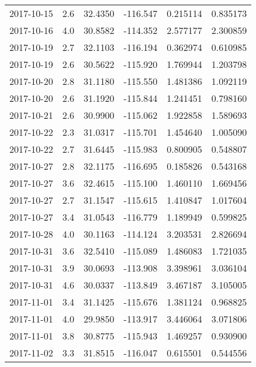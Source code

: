 \begin{tabular}{lrrrrr}
2017-10-15 &       2.6 &  32.4350 &  -116.547 &         0.215114 &         0.835173 \\
2017-10-16 &       4.0 &  30.8582 &  -114.352 &         2.577177 &         2.300859 \\
2017-10-19 &       2.7 &  32.1103 &  -116.194 &         0.362974 &         0.610985 \\
2017-10-19 &       2.6 &  30.5622 &  -115.920 &         1.769944 &         1.203798 \\
2017-10-20 &       2.8 &  31.1180 &  -115.550 &         1.481386 &         1.092119 \\
2017-10-20 &       2.6 &  31.1920 &  -115.844 &         1.241451 &         0.798160 \\
2017-10-21 &       2.6 &  30.9900 &  -115.062 &         1.922858 &         1.589693 \\
2017-10-22 &       2.3 &  31.0317 &  -115.701 &         1.454640 &         1.005090 \\
2017-10-22 &       2.7 &  31.6445 &  -115.983 &         0.800905 &         0.548807 \\
2017-10-27 &       2.8 &  32.1175 &  -116.695 &         0.185826 &         0.543168 \\
2017-10-27 &       3.6 &  32.4615 &  -115.100 &         1.460110 &         1.669456 \\
2017-10-27 &       2.7 &  31.1547 &  -115.615 &         1.410847 &         1.017604 \\
2017-10-27 &       3.4 &  31.0543 &  -116.779 &         1.189949 &         0.599825 \\
2017-10-28 &       4.0 &  30.1163 &  -114.124 &         3.203531 &         2.826694 \\
2017-10-31 &       3.6 &  32.5410 &  -115.089 &         1.486083 &         1.721035 \\
2017-10-31 &       3.9 &  30.0693 &  -113.908 &         3.398961 &         3.036104 \\
2017-10-31 &       4.6 &  30.0337 &  -113.849 &         3.467187 &         3.105005 \\
2017-11-01 &       3.4 &  31.1425 &  -115.676 &         1.381124 &         0.968825 \\
2017-11-01 &       4.0 &  29.9850 &  -113.917 &         3.446064 &         3.071806 \\
2017-11-01 &       3.8 &  30.8775 &  -115.943 &         1.469257 &         0.930900 \\
2017-11-02 &       3.3 &  31.8515 &  -116.047 &         0.615501 &         0.544556 \\

\end{tabular}
